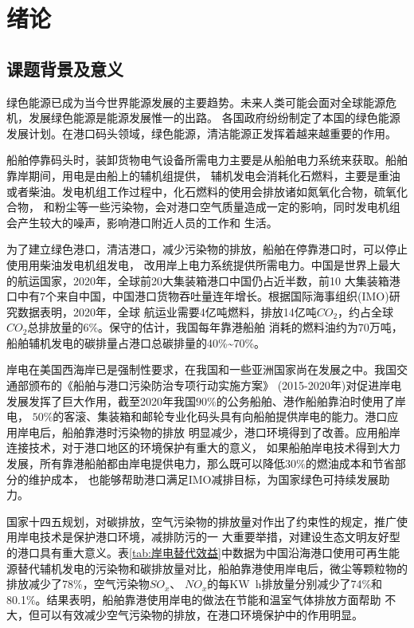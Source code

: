 \chapter{绪论}

\section{课题背景及意义}
绿色能源已成为当今世界能源发展的主要趋势。未来人类可能会面对全球能源危机，发展绿色能源是能源发展惟一的出路。
各国政府纷纷制定了本国的绿色能源发展计划。在港口码头领域，绿色能源，清洁能源正发挥着越来越重要的作用。

船舶停靠码头时，装卸货物电气设备所需电力主要是从船舶电力系统来获取。船舶靠岸期间，用电是由船上的辅机组提供，
辅机发电会消耗化石燃料，主要是重油或者柴油。发电机组工作过程中，化石燃料的使用会排放诸如氮氧化合物，硫氧化合物，
和粉尘等一些污染物，会对港口空气质量造成一定的影响，同时发电机组会产生较大的噪声，影响港口附近人员的工作和
生活。

为了建立绿色港口，清洁港口，减少污染物的排放，船舶在停靠港口时，可以停止使用用柴油发电机组发电，
改用岸上电力系统提供所需电力。中国是世界上最大的航运国家，2020年，全球前20大集装箱港口中国仍占近半数，前10
大集装箱港口中有7个来自中国，中国港口货物吞吐量连年增长。根据国际海事组织(IMO)研究数据表明，2020年，全球
航运业需要4亿吨燃料，排放14亿吨$CO_{2}$，约占全球$CO_{2}$总排放量的$6\%$。保守的估计，我国每年靠港船舶
消耗的燃料油约为$70$万吨，船舶辅机发电的碳排量占港口总碳排量的40\%\~{}70\%\cite{SP1}。

岸电在美国西海岸已是强制性要求，在我国和一些亚洲国家尚在发展之中。我国交通部颁布的《船舶与港口污染防治专项行动实施方案》
(2015-2020年)对促进岸电发展发挥了巨大作用，截至2020年我国$90\%$的公务船舶、港作船舶靠泊时使用了岸电，
$50\%$的客滚、集装箱和邮轮专业化码头具有向船舶提供岸电的能力。港口应用岸电后，船舶靠港时污染物的排放
明显减少，港口环境得到了改善。应用船岸连接技术，对于港口地区的环境保护有重大的意义，
如果船舶岸电技术得到大力发展，所有靠港船舶都由岸电提供电力，那么既可以降低$30\%$的燃油成本\cite{SP2}和节省部分的维护成本，
也能够帮助港口满足IMO减排目标，为国家绿色可持续发展助力。

国家十四五规划，对碳排放，空气污染物的排放量对作出了约束性的规定，推广使用岸电技术是保护港口环境，减排防污的一
大重要举措，对建设生态文明友好型的港口具有重大意义。表\ref{tab:岸电替代效益}中数据为中国沿海港口使用可再生能
源替代辅机发电的污染物和碳排放量对比，船舶靠港使用岸电后，微尘等颗粒物的排放减少了78\%，空气污染物$SO_{x}$、
$NO_{x}$的每\si{KW.h}排放量分别减少了74\%和80.1\%。结果表明，船舶靠港使用岸电的做法在节能和温室气体排放方面帮助
不大，但可以有效减少空气污染物的排放，在港口环境保护中的作用明显。

